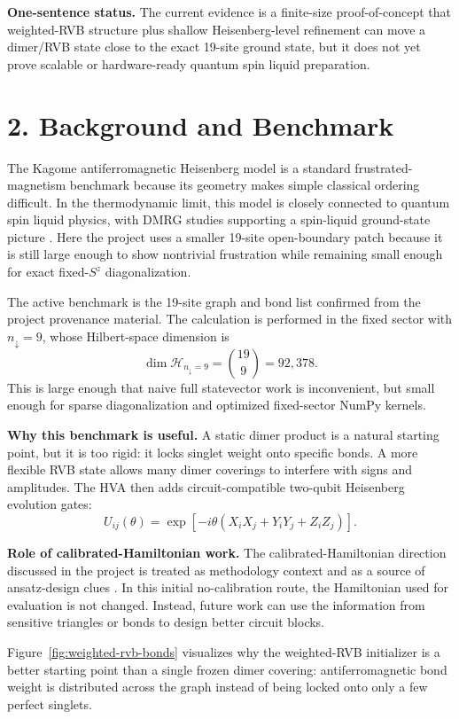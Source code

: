 \documentclass[10pt]{article}
\begin{document}
\textbf{One-sentence status.}  The current evidence is a finite-size proof-of-concept that weighted-RVB structure plus shallow Heisenberg-level refinement can move a dimer/RVB state close to the exact 19-site ground state, but it does not yet prove scalable or hardware-ready quantum spin liquid preparation.

\newpage

\section*{2. Background and Benchmark}

The Kagome antiferromagnetic Heisenberg model is a standard frustrated-magnetism benchmark because its geometry makes simple classical ordering difficult.  In the thermodynamic limit, this model is closely connected to quantum spin liquid physics, with DMRG studies supporting a spin-liquid ground-state picture \cite{yan2011,depenbrock2012}.  Here the project uses a smaller 19-site open-boundary patch because it is still large enough to show nontrivial frustration while remaining small enough for exact fixed-$S^z$ diagonalization.

The active benchmark is the 19-site graph and bond list confirmed from the project provenance material.  The calculation is performed in the fixed sector with $n_\downarrow=9$, whose Hilbert-space dimension is
\[
\dim \mathcal{H}_{n_\downarrow=9}=\binom{19}{9}=92{,}378.
\]
This is large enough that naive full statevector work is inconvenient, but small enough for sparse diagonalization and optimized fixed-sector NumPy kernels.

\textbf{Why this benchmark is useful.}  A static dimer product is a natural starting point, but it is too rigid: it locks singlet weight onto specific bonds.  A more flexible RVB state allows many dimer coverings to interfere with signs and amplitudes.  The HVA then adds circuit-compatible two-qubit Heisenberg evolution gates:
\[
U_{ij}(\theta)=\exp[-i\theta(X_iX_j+Y_iY_j+Z_iZ_j)].
\]

\textbf{Role of calibrated-Hamiltonian work.}  The calibrated-Hamiltonian direction discussed in the project is treated as methodology context and as a source of ansatz-design clues \cite{ahsan2026}.  In this initial no-calibration route, the Hamiltonian used for evaluation is not changed.  Instead, future work can use the information from sensitive triangles or bonds to design better circuit blocks.

Figure~\ref{fig:weighted-rvb-bonds} visualizes why the weighted-RVB initializer is a better starting point than a single frozen dimer covering: antiferromagnetic bond weight is distributed across the graph instead of being locked onto only a few perfect singlets.
\end{document}
